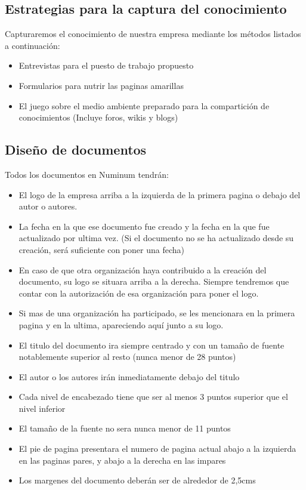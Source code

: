 \documentclass[twoside]{article}
\begin{document}
\subsection{Estrategias para la captura del conocimiento}

Capturaremos el conocimiento de nuestra empresa mediante los métodos listados a continuación:
\begin{itemize}
	\item Entrevistas para el puesto de trabajo propuesto
	\item Formularios para nutrir las paginas amarillas
	\item El juego sobre el medio ambiente preparado para la compartición de conocimientos (Incluye foros, wikis y blogs)
\end{itemize}


\newpage
\subsection{Diseño de documentos}

 Todos los documentos en Numinum tendrán:
 \begin{itemize}
 	\item  El logo de la empresa arriba a la izquierda de la primera pagina o debajo del autor o autores.
	\item La fecha en la que ese documento fue creado y la fecha en la que fue actualizado por ultima vez. (Si el documento no se ha actualizado desde su creación, será suficiente con poner una fecha)
	\item  En caso de que otra organización haya contribuido a la creación del documento, su logo se situara arriba a la derecha. Siempre tendremos que contar con la autorización de esa organización para poner el logo.
	\item Si mas de una organización ha participado, se les mencionara en la primera pagina y en la ultima, apareciendo aquí junto a su logo.
	\item El titulo del documento ira siempre centrado y con un tamaño de fuente notablemente superior al resto (nunca menor de 28 puntos)
	\item El autor o los autores irán inmediatamente debajo del titulo
	\item Cada nivel de encabezado tiene que ser al menos 3 puntos superior que el nivel inferior
	\item El tamaño de la fuente no sera nunca menor de 11 puntos
	\item  El pie de pagina presentara el numero de pagina actual abajo a la izquierda en las paginas pares, y abajo a la derecha en las impares
	\item  Los margenes del documento deberán ser de alrededor de 2,5cms
	
 \end{itemize}
\end{document}
